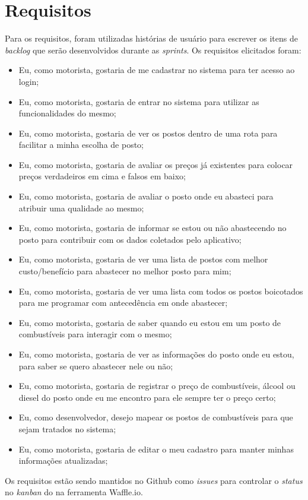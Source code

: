 \section{Requisitos}

Para os requisitos, foram utilizadas histórias de usuário para escrever os itens de \textit{backlog} que serão desenvolvidos durante as \textit{sprints}. Os requisitos elicitados foram:
\begin{itemize}
    \item Eu, como motorista, gostaria de me cadastrar no sistema para ter acesso ao login;
    \item Eu, como motorista, gostaria de entrar no sistema para utilizar as funcionalidades do mesmo;
    \item Eu, como motorista, gostaria de ver os postos dentro de uma rota para facilitar a minha escolha de posto;
    \item Eu, como motorista, gostaria de avaliar os preços já existentes para colocar preços verdadeiros em cima e falsos em baixo;
    \item Eu, como motorista, gostaria de avaliar o posto onde eu abasteci para atribuir uma qualidade ao mesmo;
    \item Eu, como motorista, gostaria de informar se estou ou não abastecendo no posto para contribuir com os dados coletados pelo aplicativo;
    \item Eu, como motorista, gostaria de ver uma lista de postos com melhor custo/benefício para abastecer no melhor posto para mim;
    \item Eu, como motorista, gostaria de ver uma lista com todos os postos boicotados para me programar com antecedência em onde abastecer;
    \item Eu, como motorista, gostaria de saber quando eu estou em um posto de combustíveis para interagir com o mesmo;
    \item Eu, como motorista, gostaria de ver as informações do posto onde eu estou, para saber se quero abastecer nele ou não;
    \item Eu, como motorista, gostaria de registrar o preço de combustíveis, álcool ou diesel do posto onde eu me encontro para ele sempre ter o preço certo;
    \item Eu, como desenvolvedor, desejo mapear os postos de combustíveis para que sejam tratados no sistema;
    \item Eu, como motorista, gostaria de editar o meu cadastro para manter minhas informações atualizadas;
\end{itemize}
Os requisitos estão sendo mantidos no Github como \textit{issues} para controlar o \textit{status} no \textit{kanban} do  na ferramenta Waffle.io.
